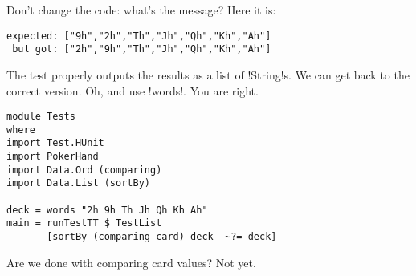 \failure Don't change the code: what's the message?
\lhA \failure Here it is:
\begin{verbatim}
expected: ["9h","2h","Th","Jh","Qh","Kh","Ah"]
 but got: ["2h","9h","Th","Jh","Qh","Kh","Ah"]
\end{verbatim}
The test properly outputs the results as a list of \il!String!s. We can get back to the correct version. Oh, and use \il!words!.
\lhN You are right.
\begin{lstlisting}[frame=single]
module Tests
where 
import Test.HUnit
import PokerHand
import Data.Ord (comparing)
import Data.List (sortBy)

deck = words "2h 9h Th Jh Qh Kh Ah"
main = runTestTT $ TestList 
       [sortBy (comparing card) deck  ~?= deck]
\end{lstlisting} %
\success Are we done with comparing card values?
\lhA Not yet.
\lhend